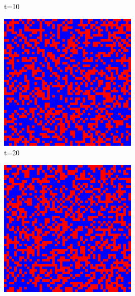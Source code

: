 \documentclass[a4paper, 11pt]{article}
\begin{document}
\begin{figure}[H]
\begin{subfigure}{.25\textwidth}
  \caption{t=10}
\end{subfigure}
\begin{subfigure}{.25\textwidth}
  \centering
  \includegraphics[width=0.9\linewidth]{SNOWDRIFT_VON_NEUMANN_50x50_t20}
  \caption{t=20}
\end{subfigure}%
\begin{subfigure}{.25\textwidth}
  \centering
  \includegraphics[width=0.9\linewidth]{SNOWDRIFT_VON_NEUMANN_50x50_t50}

\end{subfigure}
\end{figure}
\end{document}
